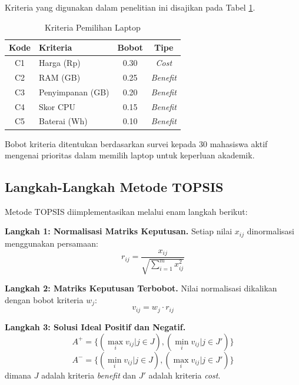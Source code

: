 \documentclass[10pt, a4paper, twocolumn]{article}
\begin{document}
Kriteria yang digunakan dalam penelitian ini disajikan pada Tabel \ref{tab:kriteria}.

\begin{table}[H]
\centering
\caption{Kriteria Pemilihan Laptop}
\label{tab:kriteria}
\begin{tabular}{clcc}
\toprule
\textbf{Kode} & \textbf{Kriteria} & \textbf{Bobot} & \textbf{Tipe} \\
\midrule
C1 & Harga (Rp) & 0.30 & \textit{Cost} \\
C2 & RAM (GB) & 0.25 & \textit{Benefit} \\
C3 & Penyimpanan (GB) & 0.20 & \textit{Benefit} \\
C4 & Skor CPU & 0.15 & \textit{Benefit} \\
C5 & Baterai (Wh) & 0.10 & \textit{Benefit} \\
\bottomrule
\end{tabular}
\end{table}

Bobot kriteria ditentukan berdasarkan survei kepada 30 mahasiswa aktif mengenai prioritas dalam memilih laptop untuk keperluan akademik.

\subsection{Langkah-Langkah Metode TOPSIS}

Metode TOPSIS diimplementasikan melalui enam langkah berikut:

\textbf{Langkah 1: Normalisasi Matriks Keputusan.}
Setiap nilai $x_{ij}$ dinormalisasi menggunakan persamaan:
\begin{equation}
r_{ij} = \frac{x_{ij}}{\sqrt{\sum_{i=1}^{m} x_{ij}^2}}
\end{equation}

\textbf{Langkah 2: Matriks Keputusan Terbobot.}
Nilai normalisasi dikalikan dengan bobot kriteria $w_j$:
\begin{equation}
v_{ij} = w_j \cdot r_{ij}
\end{equation}

\textbf{Langkah 3: Solusi Ideal Positif dan Negatif.}
\begin{equation}
A^+ = \{(\max_i v_{ij} | j \in J), (\min_i v_{ij} | j \in J')\}
\end{equation}
\begin{equation}
A^- = \{(\min_i v_{ij} | j \in J), (\max_i v_{ij} | j \in J')\}
\end{equation}
dimana $J$ adalah kriteria \textit{benefit} dan $J'$ adalah kriteria \textit{cost}.
\end{document}
